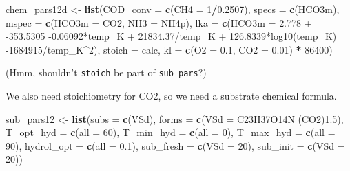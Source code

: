 \documentclass[
]{article}
\newenvironment{Shaded}{\begin{snugshade}}{\end{snugshade}}
\newcommand{\AttributeTok}[1]{\textcolor[rgb]{0.13,0.29,0.53}{#1}}
\newcommand{\DecValTok}[1]{\textcolor[rgb]{0.00,0.00,0.81}{#1}}
\newcommand{\FloatTok}[1]{\textcolor[rgb]{0.00,0.00,0.81}{#1}}
\newcommand{\FunctionTok}[1]{\textcolor[rgb]{0.13,0.29,0.53}{\textbf{#1}}}
\newcommand{\NormalTok}[1]{#1}
\newcommand{\OtherTok}[1]{\textcolor[rgb]{0.56,0.35,0.01}{#1}}
\newcommand{\SpecialCharTok}[1]{\textcolor[rgb]{0.81,0.36,0.00}{\textbf{#1}}}
\newcommand{\StringTok}[1]{\textcolor[rgb]{0.31,0.60,0.02}{#1}}
\begin{document}
\begin{Shaded}
\begin{Highlighting}[]
\NormalTok{chem\_pars12d }\OtherTok{\textless{}{-}} \FunctionTok{list}\NormalTok{(}\AttributeTok{COD\_conv =} \FunctionTok{c}\NormalTok{(}\AttributeTok{CH4 =} \DecValTok{1}\SpecialCharTok{/}\FloatTok{0.2507}\NormalTok{),}
                     \AttributeTok{specs =} \FunctionTok{c}\NormalTok{(}\StringTok{\textquotesingle{}HCO3m\textquotesingle{}}\NormalTok{),}
                     \AttributeTok{mspec =} \FunctionTok{c}\NormalTok{(}\AttributeTok{HCO3m =} \StringTok{\textquotesingle{}CO2\textquotesingle{}}\NormalTok{, }\AttributeTok{NH3 =} \StringTok{\textquotesingle{}NH4p\textquotesingle{}}\NormalTok{),}
                     \AttributeTok{lka =} \FunctionTok{c}\NormalTok{(}\AttributeTok{HCO3m =} \StringTok{\textquotesingle{}{-}2.778 + {-}353.5305 {-}0.06092*temp\_K + 21834.37/temp\_K + 126.8339*log10(temp\_K) {-}1684915/temp\_K\^{}2\textquotesingle{}}\NormalTok{),}
                     \AttributeTok{stoich =} \StringTok{\textquotesingle{}calc\textquotesingle{}}\NormalTok{,}
                     \AttributeTok{kl =} \FunctionTok{c}\NormalTok{(}\AttributeTok{O2 =} \FloatTok{0.1}\NormalTok{, }\AttributeTok{CO2 =} \FloatTok{0.01}\NormalTok{) }\SpecialCharTok{*} \DecValTok{86400}\NormalTok{)}
\end{Highlighting}
\end{Shaded}

(Hmm, shouldn't \texttt{stoich} be part of \texttt{sub\_pars}?)

We also need stoichiometry for CO2, so we need a substrate chemical
formula.

\begin{Shaded}
\begin{Highlighting}[]
\NormalTok{sub\_pars12 }\OtherTok{\textless{}{-}} \FunctionTok{list}\NormalTok{(}\AttributeTok{subs =} \FunctionTok{c}\NormalTok{(}\StringTok{\textquotesingle{}VSd\textquotesingle{}}\NormalTok{),}
                   \AttributeTok{forms =} \FunctionTok{c}\NormalTok{(}\AttributeTok{VSd =} \StringTok{\textquotesingle{}C23H37O14N (CO2)1.5\textquotesingle{}}\NormalTok{),}
                   \AttributeTok{T\_opt\_hyd =} \FunctionTok{c}\NormalTok{(}\AttributeTok{all =} \DecValTok{60}\NormalTok{),}
                   \AttributeTok{T\_min\_hyd =} \FunctionTok{c}\NormalTok{(}\AttributeTok{all =} \DecValTok{0}\NormalTok{),}
                   \AttributeTok{T\_max\_hyd =} \FunctionTok{c}\NormalTok{(}\AttributeTok{all =} \DecValTok{90}\NormalTok{),}
                   \AttributeTok{hydrol\_opt =} \FunctionTok{c}\NormalTok{(}\AttributeTok{all =} \FloatTok{0.1}\NormalTok{),}
                   \AttributeTok{sub\_fresh =} \FunctionTok{c}\NormalTok{(}\AttributeTok{VSd =} \DecValTok{20}\NormalTok{),}
                   \AttributeTok{sub\_init =} \FunctionTok{c}\NormalTok{(}\AttributeTok{VSd =} \DecValTok{20}\NormalTok{))}
\end{Highlighting}
\end{Shaded}
\end{document}
